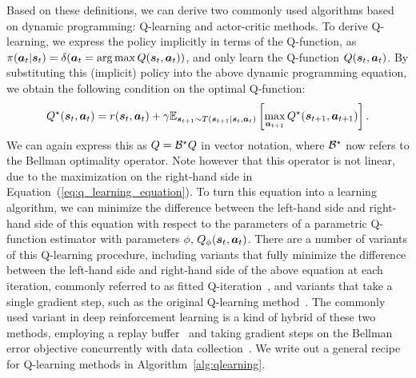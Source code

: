 \documentclass[../thesis.tex]{subfiles}
\begin{document}
Based on these definitions, we can derive two commonly used algorithms based on dynamic programming: Q-learning and actor-critic methods. To derive Q-learning, we express the policy implicitly in terms of the Q-function, as \mbox{$\pi(\boldsymbol{a}_t | \boldsymbol{s}_t) = \delta(\boldsymbol{a}_t = \arg\max Q(\boldsymbol{s}_t,\boldsymbol{a}_t))$}, and only learn the Q-function $Q(\boldsymbol{s}_t,\boldsymbol{a}_t)$. By substituting this (implicit) policy into the above dynamic programming equation, we obtain the following condition on the optimal Q-function:
\begin{equation}
Q^\star(\boldsymbol{s}_t, \boldsymbol{a}_t) = r(\boldsymbol{s}_t,\boldsymbol{a}_t) + \gamma \mathbb{E}_{\boldsymbol{s}_{t+1} \sim T(\boldsymbol{s}_{t+1}|\boldsymbol{s}_t,\boldsymbol{a}_t)}\left[
\max_{\boldsymbol{a}_{t+1}} Q^\star(\boldsymbol{s}_{t+1},\boldsymbol{a}_{t+1})
\right]. \label{eq:q_learning_equation}
\end{equation}
We can again express this as ${Q} = \mathcal{B}^\star {Q}$ in vector notation, where $\mathcal{B}^\star$ now refers to the Bellman optimality operator. Note however that this operator is not linear, due to the maximization on the right-hand side in Equation~(\ref{eq:q_learning_equation}). To turn this equation into a learning algorithm, we can minimize the difference between the left-hand side and right-hand side of this equation with respect to the parameters of a parametric Q-function estimator with parameters $\phi$, $Q_\phi(\boldsymbol{s}_t,\boldsymbol{a}_t)$. There are a number of variants of this Q-learning procedure, including variants that fully minimize the difference between the left-hand side and right-hand side of the above equation at each iteration, commonly referred to as fitted Q-iteration~\citep{ernst2005tree,Riedmiller2005}, and variants that take a single gradient step, such as the original Q-learning method~\citep{watkins1992q}. The commonly used variant in deep reinforcement learning is a kind of hybrid of these two methods, employing a replay buffer~\citep{lin1992self} and taking gradient steps on the Bellman error objective concurrently with data collection~\citep{mnih2013playing}. We write out a general recipe for Q-learning methods in Algorithm~\ref{alg:qlearning}.
\end{document}
